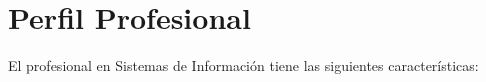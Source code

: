 \section{Perfil Profesional}\label{sec:professional-profile}
El profesional en Sistemas de Información tiene las siguientes características:


\newenvironment{profile}{\begin{itemize}}{\end{itemize}}

